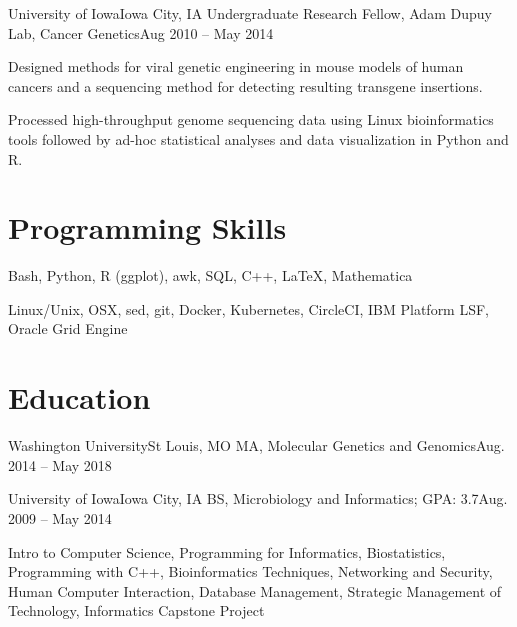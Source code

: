         \resumeItemListEnd

        \resumeSubheading
        {University of Iowa}{Iowa City, IA}
        {Undergraduate Research Fellow, Adam Dupuy Lab, Cancer Genetics}{Aug 2010 -- May 2014}

        \resumeItemListStart

            {Designed methods for viral genetic engineering in mouse models of human cancers and a sequencing method for detecting resulting transgene insertions.}
            
            {Processed high-throughput genome sequencing data using Linux bioinformatics tools followed by ad-hoc statistical analyses and data visualization in Python and R.}

        \resumeItemListEnd

    \resumeSubHeadingListEnd
    
\section{Programming Skills}
    \resumeSubHeadingListStart

        {Bash, Python, R (ggplot), awk, SQL, C++, \LaTeX, Mathematica}
          
        {Linux/Unix, OSX, sed, git, Docker, Kubernetes, CircleCI, IBM Platform LSF, Oracle Grid Engine}
          
    \resumeSubHeadingListEnd

\section{Education}
   \resumeSubHeadingListStart
   
      \resumeSubheading
      {Washington University}{St Louis, MO}
      {MA, Molecular Genetics and Genomics}{Aug. 2014 -- May 2018}
      
      \resumeSubheading
      {University of Iowa}{Iowa City, IA}
      {BS, Microbiology and Informatics;  GPA: 3.7}{Aug. 2009 -- May 2014}
      
      \resumeItemListStart
      
         {Intro to Computer Science, Programming for Informatics, Biostatistics, Programming with C++, Bioinformatics Techniques, Networking and Security, Human Computer Interaction, Database Management, Strategic Management of Technology, Informatics Capstone Project}
      
